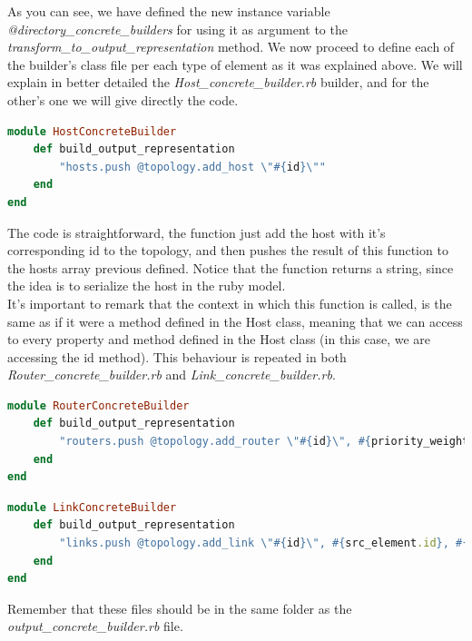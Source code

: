 As you can see, we have defined the new instance variable \textit{@directory\_concrete\_builders} for using it as argument to the \textit{transform\_to\_output\_representation} method. We now proceed to define each of the builder's class file per each type of element as it was explained above. We will explain in better detailed the \textit{Host\_concrete\_builder.rb} builder, and for the other's one we will give directly the code. 

\begin{lstlisting}[language=Ruby,breaklines=true,title=Host\_concrete\_builder.rb]
module HostConcreteBuilder    
    def build_output_representation
    	"hosts.push @topology.add_host \"#{id}\""
    end      
end
\end{lstlisting}

The code is straightforward, the function just add the host with it's corresponding id to the topology, and then pushes the result of this function to the hosts array previous defined. Notice that the function returns a string, since the idea is to serialize the host in the ruby model. \\
It's important to remark that the context in which this function is called, is the same as if it were a method defined in the Host class, meaning that we can access to every property and method defined in the Host class (in this case, we are accessing the id method). This behaviour is repeated in both \textit{Router\_concrete\_builder.rb} and \textit{Link\_concrete\_builder.rb}.\\

\begin{lstlisting}[language=Ruby,breaklines=true,title=Router\_concrete\_builder.rb]
module RouterConcreteBuilder    
    def build_output_representation
    	"routers.push @topology.add_router \"#{id}\", #{priority_weights}"
    end      
end
\end{lstlisting}

\begin{lstlisting}[language=Ruby,breaklines=true,title=Link\_concrete\_builder.rb]
module LinkConcreteBuilder    
    def build_output_representation
    	"links.push @topology.add_link \"#{id}\", #{src_element.id}, #{src_port}, #{dst_element.id}, #{dst_port}, #{bandwith}"
    end      
end
\end{lstlisting}

Remember that these files should be in the same folder as the \textit{output\_concrete\_builder.rb} file.\\

